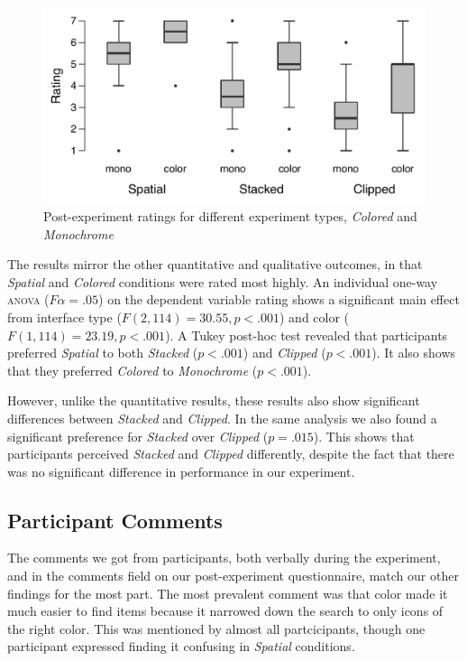 \documentclass[nobib]{tufte-book} %
\begin{document}
\begin{figure}
  \includegraphics{post-color.pdf}
  \caption{Post-experiment ratings for different experiment types, \emph{Colored} and \emph{Monochrome}}
  \label{fig:post-color}
\end{figure}

The results mirror the other quantitative and qualitative outcomes, in that \emph{Spatial} and \emph{Colored} conditions were rated most highly. An individual one-way \textsc{anova} ($F\alpha = .05$) on the dependent variable rating shows a significant main effect from interface type ($F(2,114) = 30.55, p < .001$) and color ($F(1,114) = 23.19, p < .001$). A Tukey post-hoc test revealed that participants preferred \emph{Spatial} to both \emph{Stacked} ($p < .001$) and \emph{Clipped} ($p < .001$). It also shows that they preferred \emph{Colored} to \emph{Monochrome} ($p < .001$).

However, unlike the quantitative results, these results also show significant differences between \emph{Stacked} and \emph{Clipped}. In the same analysis we also found a significant preference for \emph{Stacked} over \emph{Clipped} ($p = .015$). This shows that participants perceived \emph{Stacked} and \emph{Clipped} differently, despite the fact that there was no significant difference in performance in our experiment.

\subsection{Participant Comments}
The comments we got from participants, both verbally during the experiment, and in the comments field on our post-experiment questionnaire, match our other findings for the most part. The most prevalent comment was that color made it much easier to find items because it narrowed down the search to only icons of the right color. This was mentioned by almost all partcicipants, though one participant expressed finding it confusing in \emph{Spatial} conditions.
\end{document}

